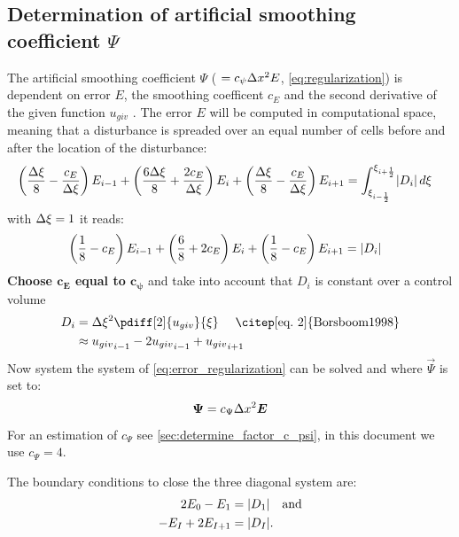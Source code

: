 \subsection{Determination of artificial smoothing coefficient $\Psi$}\label{sec:determine_psi}
The artificial smoothing coefficient $\Psi$ ( $ = c_{\psi} \Delta x^2 E$, \autoref{eq:regularization}) is dependent on error $E$, the smoothing coefficent $c_E$ and the second derivative of the given function $u_{giv}$ \citep[eq.\ 8]{Borsboom1998}.
The error $E$ will be computed in computational space, meaning that a disturbance is spreaded over an equal number of cells before and after the location of the disturbance:
%
\begin{align}
    &\left(\frac{\Delta \xi}{8}-\frac{c_E}{\Delta \xi}\right) E_{i-1} + \left(\frac{6\Delta \xi}{8} + \frac{2c_E}{\Delta \xi}\right) E_i + \left(\frac{\Delta \xi}{8} - \frac{c_E}{\Delta \xi}\right)E_{i+1}
    =  \int_{\xi_{i-\frac{1}{2}}}^{\xi_{i+\frac{1}{2}}} \lvert D_i \rvert \, d\xi
    \label{eq:error_regularization}
\end{align}
with $\Delta \xi =1$ it reads:
\begin{align}
    &\left(\frac{1}{8}-c_E\right) E_{i-1} + \left(\frac{6}{8} + 2c_E\right) E_i + \left(\frac{1}{8} - c_E\right)E_{i+1}
    =   \lvert D_i \rvert
\end{align}
\textbf{Choose $\mathbf{c_E}$ equal to $\mathbf{c_{\psi}}$} and take into account that $D_i$ is constant over a control volume
\begin{align}
    D_i & = \Dxi^2 \pdiff[2]{u_{giv}}{\xi} \quad \text{ \citep[eq.\ 2]{Borsboom1998}}
    \\ & \approx {u_{giv}}_{i-1} - 2 {u_{giv}}_{i-1} + {u_{giv}}_{i+1}
\end{align}
%
Now system the system of \autoref{eq:error_regularization} can be solved and where $\vec{\Psi}$ is set to:
\begin{align}
    \bm{\Psi} = c_{\Psi}\Delta x^2 \bm{E}
\end{align}
For an estimation of $c_{\Psi}$ see \autoref{sec:determine_factor_c_psi}, in this document we use $c_{\Psi} = 4$.

The boundary conditions to close the three diagonal system are:
\begin{align}
    2 E_0 - E_1 & = \lvert D_{1} \rvert \quad \text{and}
    \\
    - E_{I} + 2 E_{I+1} & = \lvert D_{I} \rvert.
\end{align}

